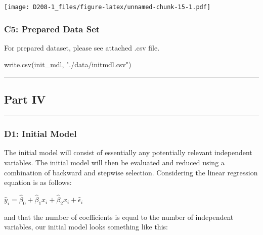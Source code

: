 \documentclass[
]{article}
\newenvironment{Shaded}{\begin{snugshade}}{\end{snugshade}}
\newcommand{\FunctionTok}[1]{\textcolor[rgb]{0.00,0.00,0.00}{#1}}
\newcommand{\NormalTok}[1]{#1}
\newcommand{\StringTok}[1]{\textcolor[rgb]{0.31,0.60,0.02}{#1}}
\begin{document}
\texttt{[image: D208-1\_files/figure-latex/unnamed-chunk-15-1.pdf]}

\hypertarget{c5-prepared-data-set}{%
\subsubsection{C5: Prepared Data Set}\label{c5-prepared-data-set}}

For prepared dataset, please see attached .csv file.

\begin{Shaded}
\begin{Highlighting}[]
\FunctionTok{write.csv}\NormalTok{(init\_mdl, }\StringTok{"./data/initmdl.csv"}\NormalTok{)}
\end{Highlighting}
\end{Shaded}

\begin{center}\rule{0.5\linewidth}{0.5pt}\end{center}

\hypertarget{part-iv}{%
\subsection{Part IV}\label{part-iv}}

\begin{center}\rule{0.5\linewidth}{0.5pt}\end{center}

\hypertarget{d1-initial-model}{%
\subsubsection{D1: Initial Model}\label{d1-initial-model}}

The initial model will consist of essentially any potentially relevant
independent variables. The initial model will then be evaluated and
reduced using a combination of backward and stepwise selection.
Considering the linear regression equation is as follows:

\(\hat{y}_i = \hat{\beta}_0 + \hat{\beta}_1 x_i + \hat{\beta}_2 x_i + \hat{\epsilon}_i\)

and that the number of coefficients is equal to the number of
independent variables, our initial model looks something like this:
\end{document}
